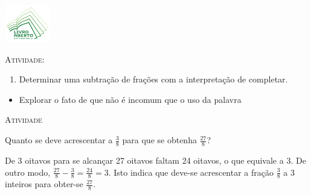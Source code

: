 \documentclass[10 pt,usenames,dvipsnames, oneside]{article}
\begin{document}
\begin{center}
  \begin{minipage}[l]{3cm}
\includegraphics[width=2cm]{../../../Figuras/logo}       
\end{minipage}\hfill
\begin{minipage}[r]{.8\textwidth}
 {\Large \scshape Atividade: }  
\end{minipage}
\end{center}
\vspace{.2cm}

\ifdefined\prof
\begin{goals}
\begin{enumerate}
  \item     Determinar uma subtração de frações com a interpretação de completar.
\end{enumerate}

\tcblower

\begin{itemize}
  \item     Explorar o fato de que não é incomum que o uso da palavra
\end{itemize}
\end{goals}

\bigskip
\begin{center}
{\large \scshape Atividade}
\end{center}
\fi

Quanto se deve acrescentar a $\frac{3}{8}$ para que se obtenha $\frac{27}{8}$?


\ifdefined\prof
\begin{solucao}

De 3 oitavos para se alcançar 27 oitavos faltam 24 oitavos, o que equivale a 3. De outro modo, $\frac{27}{8} - \frac{3}{8} = \frac{24}{8} = 3$. Isto indica que deve-se acrescentar a fração $\frac{3}{8}$ a 3 inteiros para obter-se $\frac{27}{8}$.

\end{solucao}
\fi
\end{document}
